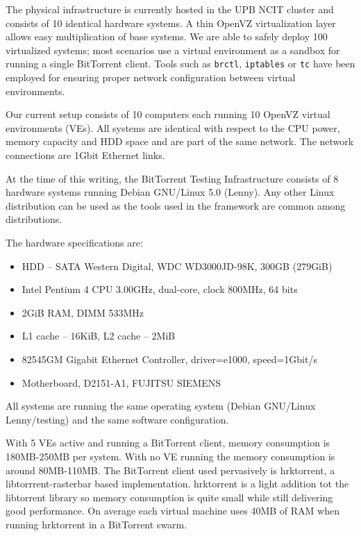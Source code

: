 The physical infrastructure is currently hosted in the UPB NCIT cluster and
consists of 10 identical hardware systems. A thin OpenVZ virtualization layer
allows easy multiplication of base systems. We are able to safely deploy 100
virtualized systems; most scenarios use a virtual environment as a sandbox for
running a single BitTorrent client. Tools such as \texttt{brctl},
\texttt{iptables} or \texttt{tc} have been employed for ensuring proper
network configuration between virtual environments.

Our current setup consists of 10 computers each running 10 OpenVZ virtual
environments (VEs). All systems are  identical with respect to the CPU power,
memory capacity and HDD space and are part of the same network. The network
connections are 1Gbit Ethernet links.

At the time of this writing, the BitTorrent Testing Infrastructure consists of
8 hardware systems running Debian GNU/Linux 5.0 (Lenny). Any other Linux
distribution can be used as the tools used in the framework are common among
distributions.

The hardware specifications are:

\begin{itemize}
  \item HDD -- SATA Western Digital, WDC WD3000JD-98K, 300GB (279GiB)
  \item Intel Pentium 4 CPU 3.00GHz, dual-core, clock 800MHz, 64 bits
  \item 2GiB RAM, DIMM 533MHz
  \item L1 cache -- 16KiB, L2 cache -- 2MiB
  \item 82545GM Gigabit Ethernet Controller, driver=e1000, speed=1Gbit/s
  \item Motherboard, D2151-A1, FUJITSU SIEMENS
\end{itemize}

All systems are running the same operating system (Debian GNU/Linux
Lenny/testing) and the same software configuration.

With 5 VEs active and running a BitTorrent client, memory consumption is
180MB-250MB per system. With no VE running the memory consumption is around
80MB-110MB. The BitTorrent client used pervasively is hrktorrent, a
libtorrrent-rasterbar based implementation. hrktorrent is a light addition tot
the libtorrent library so memory consumption is quite small while still
delivering good performance. On average each virtual machine uses 40MB of RAM
when running hrktorrent in a BitTorrent swarm.

